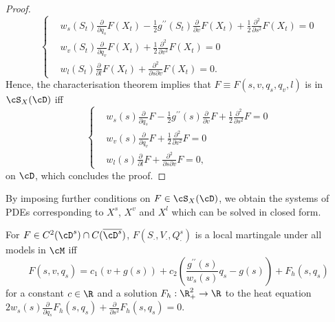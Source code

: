 \documentclass[11pt]{article}
\begin{document}
\begin{proof}
$$
\begin{cases}
&w_s(S_t) \frac{\partial}{\partial q_s} F(X_t) - \frac{1}{2} g^{\prime\prime}(S_t) \frac{\partial}{\partial v} F(X_t) + \frac{1}{2} \frac{\partial^2}{\partial s^2} F(X_t) = 0 \\
%
%
%
&w_v(S_t) \frac{\partial}{\partial q_v} F(X_t) + \frac{1}{2} \frac{\partial^2}{\partial v^2} F(X_t) = 0 \\
%
%
%
&w_l(S_t) \frac{\partial}{\partial l} F(X_t) + \frac{\partial^2}{\partial s \partial v} F(X_t) = 0.
\end{cases}
$$
Hence, the characterisation theorem implies that $F \equiv F(s, v, q_s, q_v, l)$ is in $\cS_X(\cD)$ iff
$$
\begin{cases} 
&w_s(s) \frac{\partial}{\partial q_s} F - \frac{1}{2} g^{\prime\prime}(s) \frac{\partial}{\partial v} F + \frac{1}{2} \frac{\partial^2}{\partial s^2} F = 0 \\
%
%
%
&w_v(s) \frac{\partial}{\partial q_v} F + \frac{1}{2} \frac{\partial^2}{\partial v^2} F = 0 \\
%
%
%
&w_l(s) \frac{\partial}{\partial l} F + \frac{\partial^2}{\partial s \partial v} F = 0,
\end{cases}
$$
on $\cD$, which concludes the proof. 

\end{proof}

By imposing further conditions on $F \in \cS_X(\cD)$, we obtain the systems of PDEs corresponding to $X^s$, $X^v$ and $X^l$ which can be solved in closed form.

\begin{proposition}
\label{proposition: MFIV}
For $F \in C^2(\cD^s) \cap C(\overline{\cD^s})$, $F(S_\cdot, V_\cdot, Q^s_\cdot)$ is a local martingale under all models in $\cM$ iff
\begin{equation}
\label{MFIV}
F(s, v, q_s) = c_1(v + g(s)) + c_2 \left( \frac{g^{\prime\prime}(s)}{w_s(s)} q_s - g(s) \right) + F_h(s,q_s)
\end{equation}
for a constant $c \in \R$ and a solution $F_h: \R_+^2 \to \R$ to the heat equation $
2 w_s(s) \frac{\partial} {\partial q_s} F_h(s, q_s) + \frac{\partial}{\partial s^2} F_h(s, q_s) = 0$. 
\end{proposition}
\end{document}
